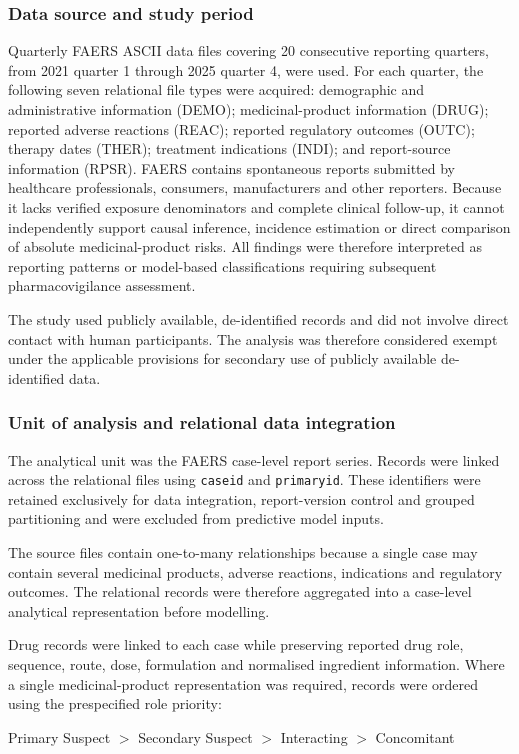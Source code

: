 \documentclass[10pt]{article}
\begin{document}
\subsubsection{Data source and study period}
Quarterly FAERS ASCII data files covering 20 consecutive reporting quarters, from 2021 quarter 1 through 2025 quarter 4, were used. For each quarter, the following seven relational file types were acquired: demographic and administrative information (DEMO); medicinal-product information (DRUG); reported adverse reactions (REAC); reported regulatory outcomes (OUTC); therapy dates (THER); treatment indications (INDI); and report-source information (RPSR). FAERS contains spontaneous reports submitted by healthcare professionals, consumers, manufacturers and other reporters. Because it lacks verified exposure denominators and complete clinical follow-up, it cannot independently support causal inference, incidence estimation or direct comparison of absolute medicinal-product risks. All findings were therefore interpreted as reporting patterns or model-based classifications requiring subsequent pharmacovigilance assessment.

The study used publicly available, de-identified records and did not involve direct contact with human participants. The analysis was therefore considered exempt under the applicable provisions for secondary use of publicly available de-identified data.

\subsubsection{Unit of analysis and relational data integration}
The analytical unit was the FAERS case-level report series. Records were linked across the relational files using \texttt{caseid} and \texttt{primaryid}. These identifiers were retained exclusively for data integration, report-version control and grouped partitioning and were excluded from predictive model inputs.

The source files contain one-to-many relationships because a single case may contain several medicinal products, adverse reactions, indications and regulatory outcomes. The relational records were therefore aggregated into a case-level analytical representation before modelling.

Drug records were linked to each case while preserving reported drug role, sequence, route, dose, formulation and normalised ingredient information. Where a single medicinal-product representation was required, records were ordered using the prespecified role priority:
\begin{center}
Primary Suspect $>$ Secondary Suspect $>$ Interacting $>$ Concomitant
\end{center}
\end{document}
